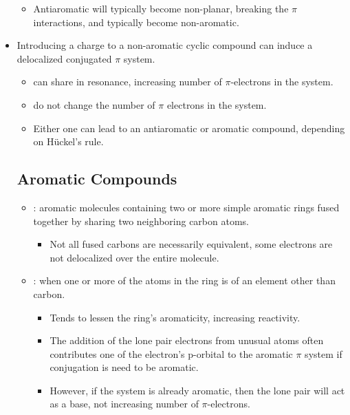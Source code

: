 \begin{itemize}
\begin{itemize}
      \item Antiaromatic will typically become non-planar, breaking the \(\pi \) interactions, and typically become non-aromatic.
    \end{itemize}
  \item Introducing a charge to a non-aromatic cyclic compound can induce a delocalized conjugated \(\pi \) system.
    \begin{itemize}
      \item {} can share in resonance, increasing number of \(\pi \)-electrons in the system.
      \item {} do not change the number of \(\pi \) electrons in the system.
      \item Either one can lead to an antiaromatic or aromatic compound, depending on H\"uckel's rule.
    \end{itemize}
  \subsection{Aromatic Compounds}\label{Aromatic Compounds}
  \begin{itemize}
      \item {}: aromatic molecules containing two or more simple aromatic rings fused together by sharing two neighboring carbon atoms.
        \begin{itemize}
          \item Not all fused carbons are necessarily equivalent, some electrons are not delocalized over the entire molecule. 
        \end{itemize}
      \item {}: when one or more of the atoms in the ring is of an element other than carbon.
        \begin{itemize}
          \item Tends to lessen the ring's aromaticity, increasing reactivity.
          \item The addition of the lone pair electrons from unusual atoms often contributes one of the electron's p-orbital to the aromatic \(\pi \) system if conjugation is need to be aromatic.
          \item However, if the system is already aromatic, then the lone pair will act as a base, not increasing number of \(\pi \)-electrons.
        \end{itemize}
  \end{itemize}
\end{itemize}


